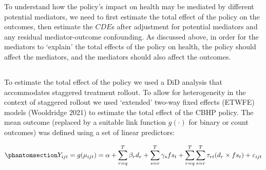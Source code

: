 \documentclass[
  letterpaper,
  DIV=11,
  numbers=noendperiod]{scrartcl}
\providecommand{\DIFadd}[1]{{\protect\color{blue}\uwave{#1}}} %
\providecommand{\DIFaddbegin}{} %
\providecommand{\DIFaddend}{} %
\providecommand{\DIFdelbegin}{} %
\providecommand{\DIFdelend}{} %
\newcommand{\DIFscaledelfig}{0.5}
\newlength{\DIFdelgraphicswidth} %
\newlength{\DIFdelgraphicsheight} %
\newcommand{\DIFaddincludegraphics}[2][]{{\color{blue}\fbox{\DIFOincludegraphics[#1]{#2}}}} %
\newcommand{\DIFdelincludegraphics}[2][]{%
\sbox{\DIFdelgraphicsbox}{\DIFOincludegraphics[#1]{#2}}%
\settoboxwidth{\DIFdelgraphicswidth}{\DIFdelgraphicsbox} %
\settoboxtotalheight{\DIFdelgraphicsheight}{\DIFdelgraphicsbox} %
\scalebox{\DIFscaledelfig}{%
\parbox[b]{\DIFdelgraphicswidth}{\usebox{\DIFdelgraphicsbox}\\[-\baselineskip] \rule{\DIFdelgraphicswidth}{0em}}\llap{\resizebox{\DIFdelgraphicswidth}{\DIFdelgraphicsheight}{%
\setlength{\unitlength}{\DIFdelgraphicswidth}%
\begin{picture}(1,1)%
\thicklines\linethickness{2pt} %
{\color[rgb]{1,0,0}\put(0,0){\framebox(1,1){}}}%
{\color[rgb]{1,0,0}\put(0,0){\line( 1,1){1}}}%
{\color[rgb]{1,0,0}\put(0,1){\line(1,-1){1}}}%
\end{picture}%
}\hspace*{3pt}}} %
} %
\DeclareRobustCommand{\DIFaddbegin}{\DIFOaddbegin \let\includegraphics\DIFaddincludegraphics} %
\DeclareRobustCommand{\DIFaddend}{\DIFOaddend \let\includegraphics\DIFOincludegraphics} %
\DeclareRobustCommand{\DIFdelbegin}{\DIFOdelbegin \let\includegraphics\DIFdelincludegraphics} %
\DeclareRobustCommand{\DIFdelend}{\DIFOaddend \let\includegraphics\DIFOincludegraphics} %
\begin{document}
To understand how the policy's impact on health may be mediated by
different potential mediators, we need to first estimate the total
effect of the policy on the outcomes, then estimate the \(CDE\)s after
adjustment for potential mediators and any residual mediator-outcome
confounding. As discussed above, in order for the mediators to `explain'
the total effects of the policy on health, the policy should affect the
mediators, and the mediators should also affect the outcomes.

\DIFdelbegin %
\DIFdelend \DIFaddbegin \subsection{\DIFadd{Total Effect}}\label{total-effect}
\DIFaddend 

To estimate the total effect of the policy we used a DiD analysis that
accommodates staggered treatment rollout. To allow for heterogeneity in
the context of staggered rollout we used `extended' two-way fixed
effects (ETWFE) models (Wooldridge 2021) to estimate the total effect of
the CBHP policy. The mean outcome (replaced by a suitable link function
\(g(\cdot)\) for binary or count outcomes) was defined using a set of
linear predictors:

\begin{equation}\DIFdelbegin %
\DIFdelend \DIFaddbegin \phantomsection\label{eq-etwfe}{Y_{ijt}=g(\mu_{ijt}) = \alpha + \sum_{r=q}^{T} \beta_{r} d_{r} + \sum_{s=r}^{T} \gamma_{s} fs_{t}+ \sum_{r=q}^{T} \sum_{s=r}^{T} \tau_{rt} (d_{r} \times fs_{t}) + \varepsilon_{ijt}}\DIFaddend \end{equation}
\end{document}
